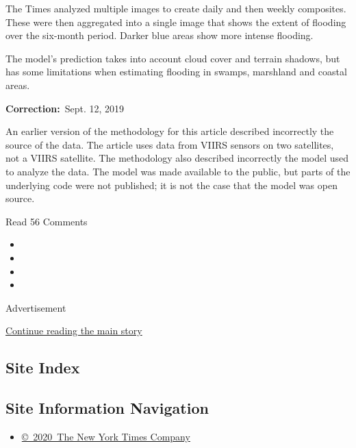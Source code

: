 The Times analyzed multiple images to create daily and then weekly
composites. These were then aggregated into a single image that shows
the extent of flooding over the six-month period. Darker blue areas show
more intense flooding.

The model's prediction takes into account cloud cover and terrain
shadows, but has some limitations when estimating flooding in swamps,
marshland and coastal areas.

\textbf{Correction:}~Sept. 12, 2019

An earlier version of the methodology for this article described
incorrectly the source of the data. The article uses data from VIIRS
sensors on two satellites, not a VIIRS satellite. The methodology also
described incorrectly the model used to analyze the data. The model was
made available to the public, but parts of the underlying code were not
published; it is not the case that the model was open source.

Read 56 Comments

\begin{itemize}
\item
\item
\item
\item
\end{itemize}

Advertisement

\protect\hyperlink{after-bottom}{Continue reading the main story}

\hypertarget{site-index}{%
\subsection{Site Index}\label{site-index}}

\hypertarget{site-information-navigation}{%
\subsection{Site Information
Navigation}\label{site-information-navigation}}

\begin{itemize}
\tightlist
\item
  \href{https://help.nytimes3xbfgragh.onion/hc/en-us/articles/115014792127-Copyright-notice}{©~2020~The
  New York Times Company}
\end{itemize}

